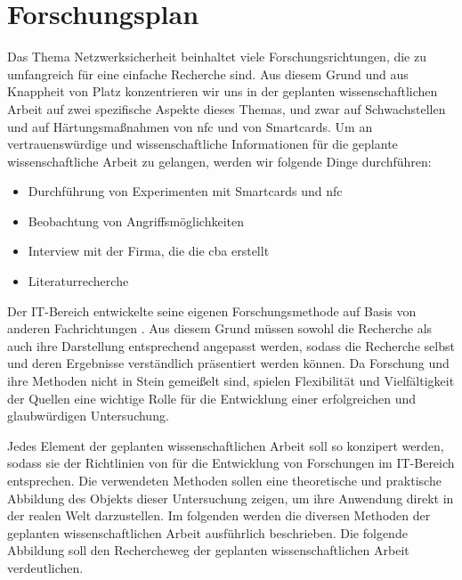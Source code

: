 \section{Forschungsplan}

Das Thema Netzwerksicherheit beinhaltet viele Forschungsrichtungen, die zu umfangreich für eine einfache
Recherche sind. Aus diesem Grund und aus Knappheit von Platz konzentrieren wir uns in der geplanten 
wissenschaftlichen Arbeit auf zwei spezifische Aspekte dieses Themas, und zwar auf Schwachstellen und 
auf Härtungsmaßnahmen von \acrshort{nfc} und von Smartcards. Um an vertrauenswürdige und wissenschaftliche
Informationen für die geplante wissenschaftliche Arbeit zu gelangen, werden wir folgende Dinge durchführen:

\begin{itemize}
  \item Durchführung von Experimenten mit Smartcards und \acrshort{nfc}
  \item Beobachtung von Angriffsmöglichkeiten
  \item Interview mit der Firma, die die \acrfull{cba} erstellt
  \item Literaturrecherche
\end{itemize}

Der IT-Bereich entwickelte seine eigenen Forschungsmethode auf Basis von anderen Fachrichtungen \cite{inbook:AHDS}.
Aus diesem Grund müssen sowohl die Recherche als auch ihre Darstellung entsprechend angepasst werden, sodass 
die Recherche selbst und deren Ergebnisse verständlich präsentiert werden können. Da Forschung und ihre Methoden
nicht in Stein gemeißelt sind, spielen Flexibilität und Vielfältigkeit der Quellen eine wichtige Rolle für die 
Entwicklung einer erfolgreichen und glaubwürdigen Untersuchung.

Jedes Element der geplanten wissenschaftlichen Arbeit soll so konzipert werden, sodass sie der Richtlinien von
\cite{refip:SGRM} für die Entwicklung von Forschungen im IT-Bereich entsprechen. Die verwendeten Methoden 
sollen eine theoretische und praktische Abbildung des Objekts dieser Untersuchung zeigen, um ihre Anwendung 
direkt in der realen Welt darzustellen. Im folgenden werden die diversen Methoden der geplanten wissenschaftlichen 
Arbeit ausführlich beschrieben. Die folgende Abbildung soll den Rechercheweg der geplanten wissenschaftlichen 
Arbeit verdeutlichen.


